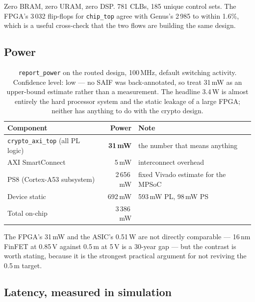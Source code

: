 \documentclass[11pt,a4paper]{article}
\begin{document}
Zero BRAM, zero URAM, zero DSP. 781 CLBs, 185 unique control sets. The FPGA's
3\,032 flip-flops for \texttt{chip\_top} agree with Genus's 2\,985 to within
1.6\%, which is a useful cross-check that the two flows are building the same
design.

\subsection{Power}

\begin{table}[h]
\centering\small
\begin{tabular}{@{}lrl@{}}
\toprule
\textbf{Component} & \textbf{Power} & \textbf{Note} \\
\midrule
\texttt{crypto\_axi\_top} (all PL logic) & \textbf{31\,mW} & the number that means anything \\
AXI SmartConnect & 5\,mW & interconnect overhead \\
PS8 (Cortex-A53 subsystem) & 2\,656\,mW & fixed Vivado estimate for the MPSoC \\
Device static & 692\,mW & 593\,mW PL, 98\,mW PS \\
\midrule
Total on-chip & 3\,386\,mW & \\
\bottomrule
\end{tabular}
\caption{\texttt{report\_power} on the routed design, 100\,MHz, default
switching activity. Confidence level: low --- no SAIF was back-annotated, so
treat 31\,mW as an upper-bound estimate rather than a measurement. The headline
3.4\,W is almost entirely the hard processor system and the static leakage of a
large FPGA; neither has anything to do with the crypto design.}
\end{table}

The FPGA's 31\,mW and the ASIC's 0.51\,W are not directly comparable --- 16\,nm
FinFET at 0.85\,V against 0.5\,\textmu m at 5\,V is a 30-year gap --- but the
contrast is worth stating, because it is the strongest practical argument for
not reviving the 0.5\,\textmu m target.

\subsection{Latency, measured in simulation}
\end{document}

